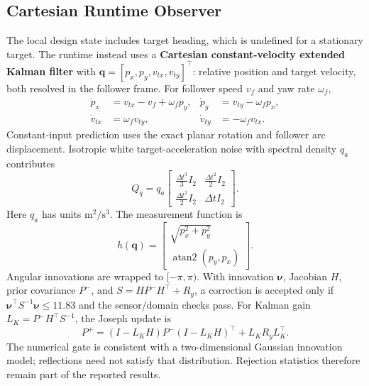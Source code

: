\subsection{Cartesian Runtime Observer}
The local design state includes target heading, which is undefined for a stationary target. The runtime instead uses a \textbf{Cartesian constant-velocity extended Kalman filter} with
$\mathbf q=[p_x,p_y,v_{tx},v_{ty}]^\top$: relative position and target velocity, both resolved in the follower frame. For follower speed $v_f$ and yaw rate $\omega_f$,
\begin{equation}
\begin{aligned}
\dot p_x&=v_{tx}-v_f+\omega_f p_y,&\dot p_y&=v_{ty}-\omega_f p_x,\\
\dot v_{tx}&=\omega_f v_{ty},&\dot v_{ty}&=-\omega_f v_{tx}.
\end{aligned}
\label{eq:cartesian}
\end{equation}
Constant-input prediction uses the exact planar rotation and follower arc displacement. Isotropic white target-acceleration noise with spectral density $q_a$ contributes
\begin{equation}
Q_q=q_a\begin{bmatrix}\tfrac{\Delta t^3}{3}I_2&\tfrac{\Delta t^2}{2}I_2\\
\tfrac{\Delta t^2}{2}I_2&\Delta t I_2\end{bmatrix}.
\end{equation}
Here $q_a$ has units $\mathrm{m^2/s^3}$. The measurement function is
\begin{equation}
h(\mathbf q)=\begin{bmatrix}\sqrt{p_x^2+p_y^2}\\\operatorname{atan2}(p_y,p_x)\end{bmatrix}.
\end{equation}
Angular innovations are wrapped to $[-\pi,\pi)$. With innovation $\boldsymbol\nu$, Jacobian $H$, prior covariance $P^-$, and $S=HP^-H^\top+R_y$, a correction is accepted only if $\boldsymbol\nu^\top S^{-1}\boldsymbol\nu\le11.83$ and the sensor/domain checks pass. For Kalman gain $L_K=P^-H^\top S^{-1}$, the Joseph update is
\begin{equation}
P^+=(I-L_KH)P^-(I-L_KH)^\top+L_KR_yL_K^\top.
\end{equation}
The numerical gate is consistent with a two-dimensional Gaussian innovation model; reflections need not satisfy that distribution. Rejection statistics therefore remain part of the reported results.

